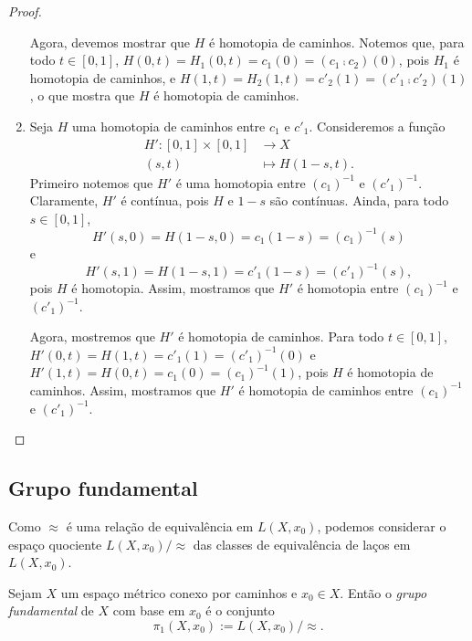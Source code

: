 \begin{proof}
\begin{enumerate}
	Agora, devemos mostrar que $H$ é homotopia de caminhos. Notemos que, para todo $t \in [0,1]$, $H(0,t) = H_1(0,t) = c_1(0) = (c_1 \comp c_2)(0)$, pois $H_1$ é homotopia de caminhos, e $H(1,t) = H_2(1,t) = c'_2(1) = (c'_1 \comp c'_2)(1)$, o que mostra que $H$ é homotopia de caminhos.
	
	\item Seja $H$ uma homotopia de caminhos entre $c_1$ e $c'_1$. Consideremos a função
	\begin{align*}
	H': [0,1] \times [0,1] &\to X \\
		(s,t) &\mapsto H(1-s,t).
	\end{align*}
	Primeiro notemos que $H'$ é uma homotopia entre  $(c_1)^{-1}$ e $(c'_1)^{-1}$. Claramente, $H'$ é contínua, pois $H$ e $1-s$ são contínuas. Ainda, para todo $s \in [0,1]$,
	\begin{equation*}
	H'(s,0)=H(1-s,0)=c_1(1-s)=(c_1)^{-1}(s)
	\end{equation*}
e
	\begin{equation*}
	H'(s,1)=H(1-s,1)=c'_1(1-s)=(c'_1)^{-1}(s),
	\end{equation*}
pois $H$ é homotopia. Assim, mostramos que $H'$ é homotopia entre $(c_1)^{-1}$ e $(c'_1)^{-1}$.
	
	Agora, mostremos que $H'$ é homotopia de caminhos. Para todo $t \in [0,1]$, $H'(0,t)=H(1,t)=c'_1(1)=(c'_1)^{-1}(0)$ e $H'(1,t)=H(0,t)=c_1(0)=(c_1)^{-1}(1)$, pois $H$ é homotopia de caminhos. Assim, mostramos que $H'$ é homotopia de caminhos entre $(c_1)^{-1}$ e $(c'_1)^{-1}$.
	\end{enumerate}
\end{proof}

\subsection{Grupo fundamental}

Como $\approx$ é uma relação de equivalência em $L(X,x_0)$, podemos considerar o espaço quociente $L(X,x_0) / \approx$ das classes de equivalência de laços em $L(X,x_0)$.

\begin{definition}
	Sejam $X$ um espaço métrico conexo por caminhos e $x_0 \in X$. Então o \emph{grupo fundamental} de $X$ com base em $x_0$ é o conjunto
	\begin{equation*}
	\pi_1(X,x_0) := L(X,x_0) / \approx.
	\end{equation*}
\end{definition}

